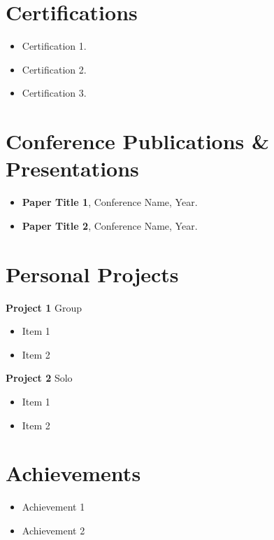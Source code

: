\documentclass[a4paper,10pt]{article}
\begin{document}
	\section{Certifications}
	
	\begin{itemize}
		\item Certification 1.
		\item Certification 2.
		\item Certification 3.
	\end{itemize}
	
	\section{Conference Publications \& Presentations}
	
	\begin{itemize}
		\item \textbf{Paper Title 1}, Conference Name, Year. \\
		\item \textbf{Paper Title 2}, Conference Name, Year. \\
	\end{itemize}
	
	\section{Personal Projects}
	
	\textbf{Project 1}  Group
	\begin{itemize}
		\item Item 1
		\item Item 2
	\end{itemize}
	
	\textbf{Project 2}  Solo
	\begin{itemize}
		\item Item 1
		\item Item 2
	\end{itemize}
	
	\section{Achievements}
	
	\begin{itemize}
		\item Achievement 1
		\item Achievement 2
	\end{itemize}
	
\end{document}
